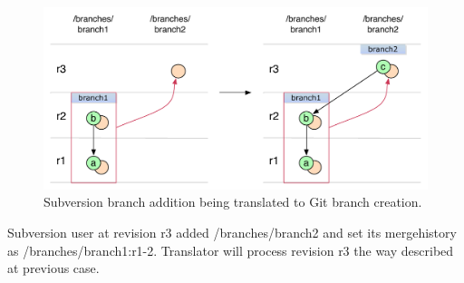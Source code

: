 \begin{enumerate}
\begin{figure}[!h]
\label{svn_branch_creation_from_mergeinfo}
\centering
\includegraphics[width=\linewidth]{img/diagrams/branch_creation_from_mergeinfo_svn_to_git.pdf}
\caption{Subversion branch addition being translated to Git branch creation.}
\end{figure}

Subversion user at revision r3 added /branches/branch2 and set its mergehistory as /branches/branch1:r1-2. Translator will process revision r3 the way described at previous case.
\end{enumerate}
